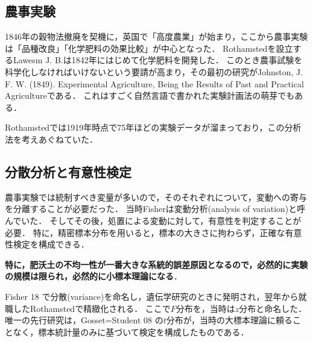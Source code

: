 \documentclass[uplatex,dvipdfmx]{jsreport}
\begin{document}
\subsection{農事実験}

\begin{history}[高度農業]
    1846年の穀物法撤廃を契機に，英国で「高度農業」が始まり，ここから農事実験は「品種改良」「化学肥料の効果比較」が中心となった．
    Rothamstedを設立するLawesm J. B.は1842年にはじめて化学肥料を開発した．
    このとき農事試験を科学化しなければいけないという要請が高まり，その最初の研究がJohnston, J. F. W. (1849). Experimental Agriculture, Being the Results of Past and Practical Agricultureである．
    これはすごく自然言語で書かれた実験計画法の萌芽でもある．
\end{history}

\begin{history}
    Rothamstedでは1919年時点で75年ほどの実験データが溜まっており，この分析法を考えあぐねていた．
\end{history}

\subsection{分散分析と有意性検定}

\begin{tcolorbox}[colframe=ForestGreen, colback=ForestGreen!10!white,breakable,colbacktitle=ForestGreen!40!white,coltitle=black,fonttitle=\bfseries\sffamily,
title=]
    農事実験では統制すべき変量が多いので，そのそれぞれについて，変動への寄与を分離することが必要だった．
    当時Fisherは変動分析(analysis of variation)と呼んでいた．
    そしてその後，処置による変動に対して，有意性を判定することが必要．
    特に，精密標本分布を用いると，標本の大きさに拘わらず，正確な有意性検定を構成できる．

    \textbf{特に，肥沃土の不均一性が一番大きな系統的誤差原因となるので，必然的に実験の規模は限られ，必然的に小標本理論になる}．
\end{tcolorbox}

\begin{history}
    Fisher 18 \cite{Fisher18}で分散(variance)を命名し，遺伝学研究のときに発明され，翌年から就職したRothamstedで精緻化される．
    ここで$F$分布を，当時は$z$分布と命名した．
    唯一の先行研究は，Gosset=Student 08 \cite{Gosset08}の$t$分布が，当時の大標本理論に頼ることなく，標本統計量のみに基づいて検定を構成したものである．
\end{history}
\end{document}
